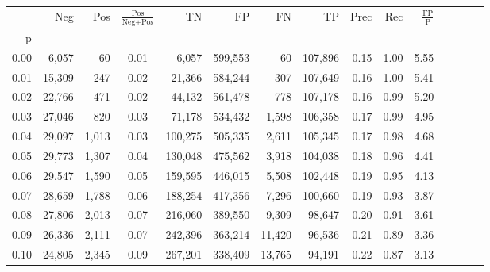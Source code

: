 \begin{tabular}{rrrcrrrrrrrrrrr}
\toprule
{} &     Neg &    Pos & $\frac{\text{Pos}}{\text{Neg}+\text{Pos}}$ &       TN &       FP &       FN &       TP &  Prec &   Rec & $\frac{\text{FP}}{\text{P}}$ \\
p    &         &        &                                            &          &          &          &          &       &       &                              \\
\midrule
0.00 &   6,057 &     60 &                                       0.01 &    6,057 &  599,553 &       60 &  107,896 &  0.15 &  1.00 &                         5.55 \\
0.01 &  15,309 &    247 &                                       0.02 &   21,366 &  584,244 &      307 &  107,649 &  0.16 &  1.00 &                         5.41 \\
0.02 &  22,766 &    471 &                                       0.02 &   44,132 &  561,478 &      778 &  107,178 &  0.16 &  0.99 &                         5.20 \\
0.03 &  27,046 &    820 &                                       0.03 &   71,178 &  534,432 &    1,598 &  106,358 &  0.17 &  0.99 &                         4.95 \\
0.04 &  29,097 &  1,013 &                                       0.03 &  100,275 &  505,335 &    2,611 &  105,345 &  0.17 &  0.98 &                         4.68 \\
0.05 &  29,773 &  1,307 &                                       0.04 &  130,048 &  475,562 &    3,918 &  104,038 &  0.18 &  0.96 &                         4.41 \\
0.06 &  29,547 &  1,590 &                                       0.05 &  159,595 &  446,015 &    5,508 &  102,448 &  0.19 &  0.95 &                         4.13 \\
0.07 &  28,659 &  1,788 &                                       0.06 &  188,254 &  417,356 &    7,296 &  100,660 &  0.19 &  0.93 &                         3.87 \\
0.08 &  27,806 &  2,013 &                                       0.07 &  216,060 &  389,550 &    9,309 &   98,647 &  0.20 &  0.91 &                         3.61 \\
0.09 &  26,336 &  2,111 &                                       0.07 &  242,396 &  363,214 &   11,420 &   96,536 &  0.21 &  0.89 &                         3.36 \\
0.10 &  24,805 &  2,345 &                                       0.09 &  267,201 &  338,409 &   13,765 &   94,191 &  0.22 &  0.87 &                         3.13 \\

\end{tabular}
